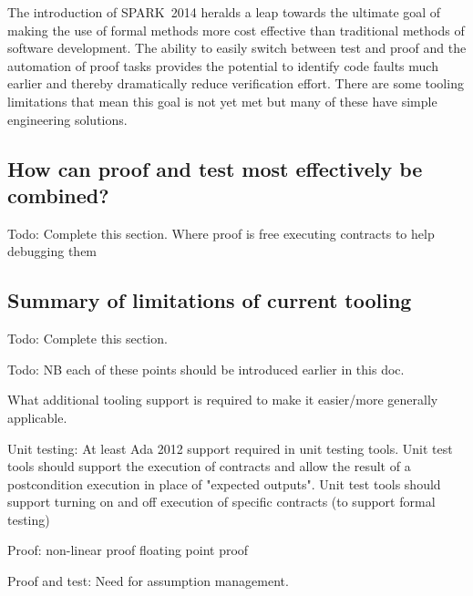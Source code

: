 \documentclass{llncs} \usepackage[utf8]{inputenc} \usepackage{url}
\newcommand{\newspark}{SPARK~2014\xspace}
\begin{document}
The introduction of \newspark heralds a leap towards the ultimate goal
of making the use of formal methods more cost effective than
traditional methods of software development. The ability to easily
switch between test and proof and the automation of proof tasks
provides the potential to identify code faults much earlier and
thereby dramatically reduce verification effort. There are some
tooling limitations that mean this goal is not yet met but many of
these have simple engineering solutions.

\subsection{How can proof and test most effectively be combined?}
Todo: Complete this section. Where proof is free executing contracts
to help debugging them

\subsection{Summary of limitations of current tooling}

Todo: Complete this section.

Todo: NB each of these points should be introduced earlier in this
doc.

What additional tooling support is required to make it easier/more
generally applicable.

Unit testing: At least Ada 2012 support required in unit testing
tools. Unit test tools should support the execution of contracts and
allow the result of a postcondition execution in place of "expected
outputs". Unit test tools should support turning on and off execution
of specific contracts (to support formal testing)

Proof: non-linear proof floating point proof

Proof and test: Need for assumption management.



\end{document}
